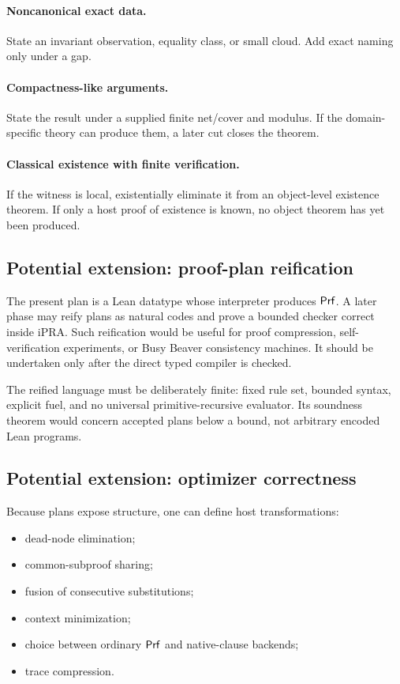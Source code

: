 \paragraph{Noncanonical exact data.}
State an invariant observation, equality class, or small cloud.  Add exact naming only under a gap.

\paragraph{Compactness-like arguments.}
State the result under a supplied finite net/cover and modulus.  If the domain-specific theory can
produce them, a later cut closes the theorem.

\paragraph{Classical existence with finite verification.}
If the witness is local, existentially eliminate it from an object-level existence theorem.  If only
a host proof of existence is known, no object theorem has yet been produced.

\subsection{Potential extension: proof-plan reification}

The present plan is a Lean datatype whose interpreter produces \(\mathsf{Prf}\).  A later phase may reify
plans as natural codes and prove a bounded checker correct inside iPRA.  Such reification would be
useful for proof compression, self-verification experiments, or Busy Beaver consistency machines.
It should be undertaken only after the direct typed compiler is checked.

The reified language must be deliberately finite: fixed rule set, bounded syntax, explicit fuel, and
no universal primitive-recursive evaluator.  Its soundness theorem would concern accepted plans below
a bound, not arbitrary encoded Lean programs.

\subsection{Potential extension: optimizer correctness}

Because plans expose structure, one can define host transformations:

\begin{itemize}
\item dead-node elimination;
\item common-subproof sharing;
\item fusion of consecutive substitutions;
\item context minimization;
\item choice between ordinary \(\mathsf{Prf}\) and native-clause backends;
\item trace compression.
\end{itemize}

